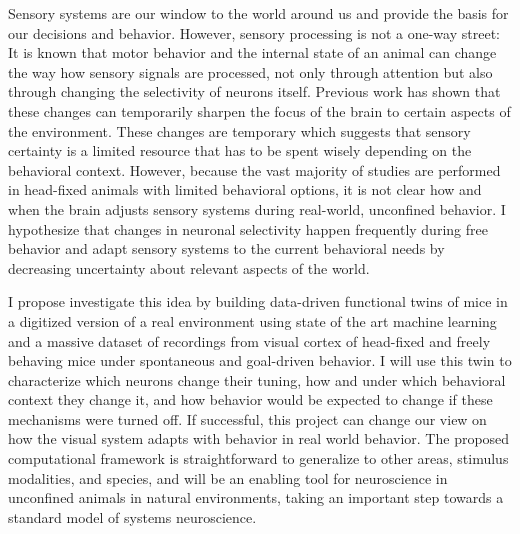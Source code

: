 Sensory systems are our window to the world around us and provide the basis for our decisions and behavior. 
However, sensory processing is not a one-way street:
It is known that motor behavior and the internal state of an animal can change the way how sensory signals are processed, not only through attention but also through changing the selectivity of  neurons itself. 
Previous work has shown that these changes can temporarily sharpen the focus of the brain to certain aspects of the environment.
These changes are temporary which suggests that sensory certainty is a limited resource that has to be spent wisely depending on the behavioral context.
However, because the vast majority of studies are performed in head-fixed animals with limited behavioral options, it is not clear how and when the brain adjusts sensory systems during real-world, unconfined behavior. 
I hypothesize that changes in neuronal selectivity happen frequently during free behavior and adapt sensory systems to the current behavioral needs by decreasing uncertainty about relevant aspects of the world.

I propose investigate this idea by building data-driven functional twins of mice in a digitized version of a real environment using state of the art machine learning and a massive dataset of recordings from visual cortex of head-fixed and freely behaving mice under spontaneous and goal-driven behavior.
I will use this twin to characterize which neurons change their tuning, how and under which behavioral context they change it, and how behavior would be expected to change if these mechanisms were turned off.
If successful, this project can change our view on how the visual system adapts with behavior in real world behavior. 
The proposed computational framework is straightforward to generalize to other areas, stimulus modalities, and species, and will be an enabling tool for neuroscience in unconfined animals in natural environments, taking an important step towards a standard model of systems neuroscience.
